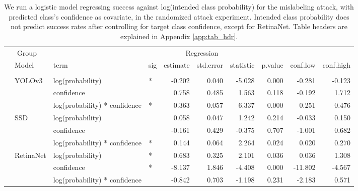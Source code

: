 \begin{longtable}[t]{llllrrrrrr}
\caption{\label{tab:mislabel_conf_table}We run a logistic model regressing success against log(intended class probability) for the mislabeling attack, with predicted class's confidence as covariate, in the randomized attack experiment. Intended class probability does not predict success rates after controlling for target class confidence, except for RetinaNet. Table headers are explained in Appendix \ref{app:tab_hdr}.}\\
\toprule
\multicolumn{2}{c}{Group} & \multicolumn{8}{c}{Regression} \\
\cmidrule(l{3pt}r{3pt}){1-2} \cmidrule(l{3pt}r{3pt}){3-10}
 & Model & term & sig & estimate & std.error & statistic & p.value & conf.low & conf.high\\
\midrule
\addlinespace[0.3em]
\multicolumn{10}{l}{\textbf{Mislabeling}}\\
\hspace{1em} & YOLOv3 & log(probability) & * & -0.202 & 0.040 & -5.028 & 0.000 & -0.281 & -0.123\\
\cmidrule{3-10}\nopagebreak
\hspace{1em} &  & confidence &  & 0.758 & 0.485 & 1.563 & 0.118 & -0.192 & 1.712\\
\cmidrule{3-10}\nopagebreak
\hspace{1em} &  & log(probability) * confidence & * & 0.363 & 0.057 & 6.337 & 0.000 & 0.251 & 0.476\\
\cmidrule{2-10}\nopagebreak
\hspace{1em} & SSD & log(probability) &  & 0.058 & 0.047 & 1.242 & 0.214 & -0.033 & 0.150\\
\cmidrule{3-10}\nopagebreak
\hspace{1em} &  & confidence &  & -0.161 & 0.429 & -0.375 & 0.707 & -1.001 & 0.682\\
\cmidrule{3-10}\nopagebreak
\hspace{1em} &  & log(probability) * confidence & * & 0.144 & 0.064 & 2.264 & 0.024 & 0.020 & 0.270\\
\cmidrule{2-10}\nopagebreak
\hspace{1em} & RetinaNet & log(probability) & * & 0.683 & 0.325 & 2.101 & 0.036 & 0.036 & 1.308\\
\cmidrule{3-10}\nopagebreak
\hspace{1em} &  & confidence & * & -8.137 & 1.846 & -4.408 & 0.000 & -11.802 & -4.567\\
\cmidrule{3-10}\nopagebreak
\hspace{1em} &  & log(probability) * confidence &  & -0.842 & 0.703 & -1.198 & 0.231 & -2.183 & 0.571\\

\end{longtable}
